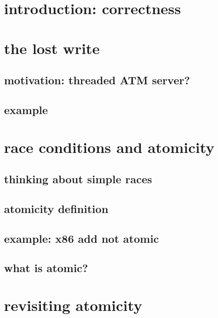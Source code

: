 \section{introduction: correctness}




\section{the lost write}

\subsection{motivation: threaded ATM server?}


\subsection{example}


\section{race conditions and atomicity}
\subsection{thinking about simple races} 


\subsection{atomicity definition}


\subsection{example: x86 add not atomic}


\subsection{what is atomic?}


\section{revisiting atomicity}
